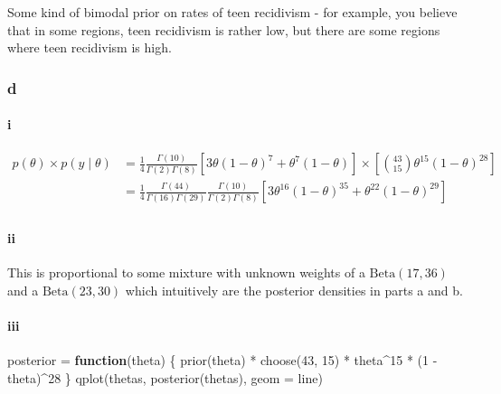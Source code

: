 \documentclass[
]{article}
\newenvironment{Shaded}{\begin{snugshade}}{\end{snugshade}}
\newcommand{\AttributeTok}[1]{\textcolor[rgb]{0.77,0.63,0.00}{#1}}
\newcommand{\ControlFlowTok}[1]{\textcolor[rgb]{0.13,0.29,0.53}{\textbf{#1}}}
\newcommand{\DecValTok}[1]{\textcolor[rgb]{0.00,0.00,0.81}{#1}}
\newcommand{\FunctionTok}[1]{\textcolor[rgb]{0.00,0.00,0.00}{#1}}
\newcommand{\NormalTok}[1]{#1}
\newcommand{\OtherTok}[1]{\textcolor[rgb]{0.56,0.35,0.01}{#1}}
\newcommand{\SpecialCharTok}[1]{\textcolor[rgb]{0.00,0.00,0.00}{#1}}
\newcommand{\StringTok}[1]{\textcolor[rgb]{0.31,0.60,0.02}{#1}}
\begin{document}
Some kind of bimodal prior on rates of teen recidivism - for example,
you believe that in some regions, teen recidivism is rather low, but
there are some regions where teen recidivism is high.

\hypertarget{d-1}{%
\subsubsection{d}\label{d-1}}

\hypertarget{i}{%
\paragraph{i}\label{i}}

\begin{align}
p(\theta) \times p(y \mid \theta) &= \frac{1}{4}\frac{\Gamma(10)}{\Gamma(2) \Gamma(8)} \left[ 3\theta (1 - \theta)^7 + \theta^7 (1 - \theta) \right] \times \left[ {43 \choose 15} \theta^{15} (1 - \theta)^{28} \right] \\
&= \frac{1}{4} \frac{\Gamma(44)}{\Gamma(16) \Gamma(29)} \frac{\Gamma(10)}{\Gamma(2) \Gamma(8)} \left[3\theta^{16} (1 - \theta)^{35} + \theta^{22} (1 - \theta)^{29} \right] \\
\end{align}

\hypertarget{ii}{%
\paragraph{ii}\label{ii}}

This is proportional to some mixture with unknown weights of a
\(\text{Beta}(17, 36)\) and a \(\text{Beta}(23, 30)\) which intuitively
are the posterior densities in parts a and b.

\hypertarget{iii}{%
\paragraph{iii}\label{iii}}

\begin{Shaded}
\begin{Highlighting}[]
\NormalTok{posterior }\OtherTok{=} \ControlFlowTok{function}\NormalTok{(theta) \{}
  \FunctionTok{prior}\NormalTok{(theta) }\SpecialCharTok{*} \FunctionTok{choose}\NormalTok{(}\DecValTok{43}\NormalTok{, }\DecValTok{15}\NormalTok{) }\SpecialCharTok{*}\NormalTok{ theta}\SpecialCharTok{\^{}}\DecValTok{15} \SpecialCharTok{*}\NormalTok{ (}\DecValTok{1} \SpecialCharTok{{-}}\NormalTok{ theta)}\SpecialCharTok{\^{}}\DecValTok{28}
\NormalTok{\}}
\FunctionTok{qplot}\NormalTok{(thetas, }\FunctionTok{posterior}\NormalTok{(thetas), }\AttributeTok{geom =} \StringTok{\textquotesingle{}line\textquotesingle{}}\NormalTok{)}
\end{Highlighting}
\end{Shaded}
\end{document}
